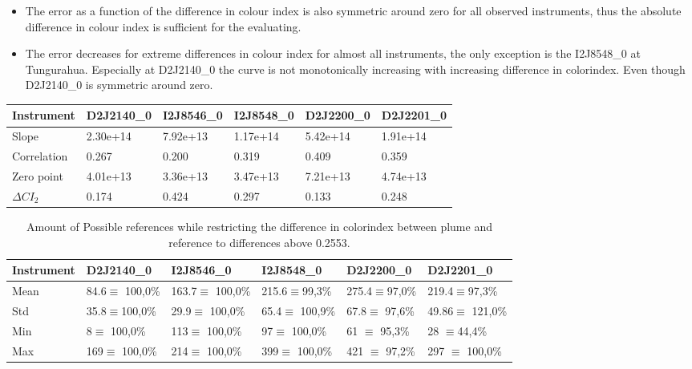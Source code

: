 \documentclass  [
  paper    = a4,
  BCOR     = 10mm,
  twoside,
  fontsize = 12pt,
  fleqn,
  toc      = bibnumbered,
  toc      = listofnumbered,
  numbers  = noendperiod,
  headings = normal,
  listof   = leveldown,
  version  = 3.03
]                                       {scrreprt}
\begin{document}
	\begin{itemize}
		\item The   error as a function of the difference in colour index is also symmetric around zero for all observed instruments, thus the absolute difference in colour index is sufficient for the evaluating.
		\item The   error decreases for extreme differences in colour index for almost all instruments, the only exception is the  I2J8548\_0 at Tungurahua. Especially at D2J2140\_0 the curve is not monotonically increasing with increasing difference in colorindex. Even though  D2J2140\_0 is symmetric around zero.
	\end{itemize}

	\begin{table}[h]
	\begin{tabular}{|p{2cm}|p{2cm}|p{2cm}|p{2cm}|p{2cm}|p{2cm}|}
			Instrument	&D2J2140\_0&I2J8546\_0& I2J8548\_0&D2J2200\_0&D2J2201\_0\\
			\toprule
			Slope&2.30e+14 &7.92e+13 &1.17e+14 &5.42e+14&1.91e+14\\
			\midrule
			Correlation&
			0.267&
			0.200&
			0.319&
			0.409&
			0.359\\
			\midrule
			Zero point&4.01e+13&3.36e+13&3.47e+13& 7.21e+13& 4.74e+13\\
						\midrule
			$\Delta CI_{2}$&0.174&0.424&0.297&0.133&0.248\\
			\bottomrule
		\end{tabular}
		\label{tab:colidxcalc}
	\end{table}


	\begin{table}[h]
	\begin{tabular}{|p{2cm}|p{2cm}|p{2cm}|p{2cm}|p{2cm}|p{2cm}|}
		Instrument	&D2J2140\_0&I2J8546\_0& I2J8548\_0&D2J2200\_0&D2J2201\_0\\
		\toprule
		Mean&
		84.6$\equiv$ 100,0\% &	163.7$\equiv$ 100,0\%&	215.6$\equiv$99,3\%&
		275.4$\equiv$97,0\% &219.4$\equiv$97,3\% \\
		\midrule
		Std&
		35.8$\equiv$100,0\% &	29.9$\equiv$	100,0\% &
		65.4$\equiv$	100,9\%&
		67.8$\equiv$	97,6\% &
		49.86$\equiv$	121,0\% \\
		\midrule
		Min&
		8$\equiv$	100,0\% &
		113$\equiv$	100,0\% 
		&97$\equiv$	100,0\% 
		&61 $\equiv$	95,3\% 
		&28	$\equiv$44,4\% \\
		\midrule
		Max
		&169$\equiv$	100,0\% 
		&214$\equiv$	100,0\% 
		&399$\equiv$	100,0\% 
		&421 $\equiv$	97,2\% 
		&297 $\equiv$	100,0\%  \\
		\bottomrule
	\end{tabular}
	\caption{Amount of Possible references while restricting the difference in colorindex  between plume and reference to differences above 0.2553.}
	\label{tab:colidxres}
\end{table}	
\end{document}
